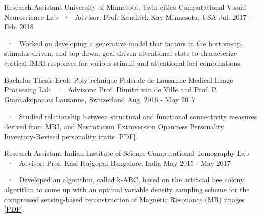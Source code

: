 \begin{cventries}
  \cventryLab
    {Research Assistant} %
    {University of Minnesota, Twin-cities} %
    {Computational Visual Neuroscience Lab ~·~ Advisor: Prof. Kendrick Kay} %
    {Minnesota, USA} %
    {Jul. 2017 - Feb. 2018} %
    { %
      \begin{cvitems}
      \item ~·~  Worked on developing a generative model that factors in the bottom-up, stimulus-driven, and top-down, goal-driven attentional state to characterize cortical fMRI responses for various stimuli and attentional loci combinations. 
      \end{cvitems}
    }
    
  \cventryLab
    {Bachelor Thesis} %
    {Ecole Polytechnique Federale de Lausanne} %
    {Medical Image Processing Lab ~·~ Advisors: Prof. Dimitri van de Ville and Prof. P. Giannakopoulos} %
    {Lausanne, Switzerland} %
    {Aug. 2016 - May 2017} %
    { %
      \begin{cvitems}
		\item ~·~ Studied relationship between structural and functional connectivity measures derived from MRI, and Neuroticism Extroversion Openness Personality Inventory-Revised personality traits \href{https://doi.org/10.3389/fpsyg.2018.02652}{[PDF]}.
      \end{cvitems}
    }

  \cventryLab
    {Research Assistant} %
    {Indian Institute of Science} %
    {Computational Tomography Lab ~·~ Advisor: Prof. Kasi Rajgopal} %
    {Bangalore, India} %
    {May 2015 - May 2017} %
    { %
      \begin{cvitems}
      \item ~·~ Developed an algorithm, called k-ABC, based on the artificial bee colony algorithm to come up with an optimal variable density sampling scheme for the compressed sensing-based reconstruction of Magnetic Resonance (MR) images \href{https://doi.org/10.1109/TENCON.2016.7848212}{[PDF]}.
      \end{cvitems}
    }


\end{cventries}

